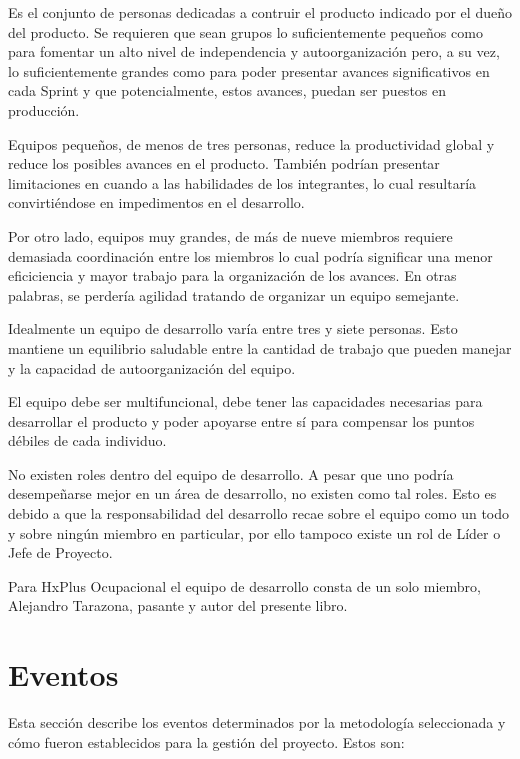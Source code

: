         Es el conjunto de personas dedicadas a contruir el producto indicado por el dueño del producto. Se requieren que sean grupos lo suficientemente pequeños como para fomentar un alto nivel de independencia y autoorganización pero, a su vez, lo suficientemente grandes como para poder presentar avances significativos en cada Sprint y que potencialmente, estos avances, puedan ser puestos en producción.
        
        Equipos pequeños, de menos de tres personas, reduce la productividad global y reduce los posibles avances en el producto. También podrían presentar limitaciones en cuando a las habilidades de los integrantes, lo cual resultaría convirtiéndose en impedimentos en el desarrollo.
        
        Por otro lado, equipos muy grandes, de más de nueve miembros requiere demasiada coordinación entre los miembros lo cual podría significar una menor eficiciencia y mayor trabajo para la organización de los avances. En otras palabras, se perdería agilidad tratando de organizar un equipo semejante.
        
        Idealmente un equipo de desarrollo varía entre tres y siete personas. Esto mantiene un equilibrio saludable entre la cantidad de trabajo que pueden manejar y la capacidad de autoorganización del equipo.
        
        El equipo debe ser multifuncional, debe tener las capacidades necesarias para desarrollar el producto y poder apoyarse entre sí para compensar los puntos débiles de cada individuo.
        
        No existen roles dentro del equipo de desarrollo. A pesar que uno podría desempeñarse mejor en un área de desarrollo, no existen como tal roles. Esto es debido a que la responsabilidad del desarrollo recae sobre el equipo como un todo y sobre ningún miembro en particular, por ello tampoco existe un rol de Líder o Jefe de Proyecto.
        
        Para HxPlus Ocupacional el equipo de desarrollo consta de un solo miembro, Alejandro Tarazona, pasante y autor del presente libro.
        
    \section{Eventos}
    
    Esta sección describe los eventos determinados por la metodología seleccionada y cómo fueron establecidos para la gestión del proyecto. Estos son:
    
